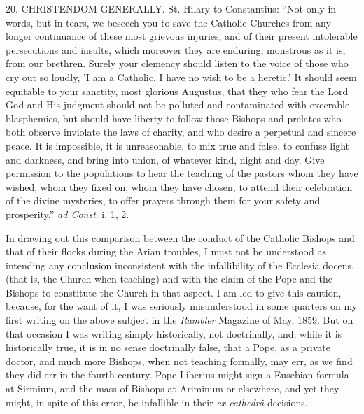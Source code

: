 20. CHRISTENDOM GENERALLY.
St. Hilary to Constantius: ``Not only in words, but in tears, we
beseech you to save the Catholic Churches from any longer continuance
of these most grievous injuries, and of their present intolerable
persecutions and insults, which moreover they are enduring, monstrous as it is, from our brethren. Surely your clemency should
listen to the voice of those who cry out so loudly, 'I am a Catholic,
I have no wish to be a heretic.' It should seem equitable to your
sanctity, most glorious Augustus, that they who fear the Lord God and
His judgment should not be polluted and contaminated with execrable
blasphemies, but should have liberty to follow those Bishops and
prelates who both observe inviolate the laws of charity, and who
desire a perpetual and sincere peace. It is impossible, it is
unreasonable, to mix true and false, to confuse light and darkness,
and bring into union, of whatever kind, night and day. Give permission
to the populations to hear the teaching of the pastors whom they have
wished, whom they fixed on, whom they have chosen, to attend their
celebration of the divine mysteries, to offer prayers through them for
your safety and prosperity.'' \emph{ad Const}. i. 1, 2.

In drawing out this comparison between the conduct of the Catholic
Bishops and that of their flocks during the Arian troubles, I must not
be understood as intending any conclusion inconsistent with the
infallibility of the Ecclesia docens, (that is, the Church when
teaching) and with the claim of the Pope and the Bishops to constitute
the Church in that aspect. I am led to give this caution, because, for
the want of it, I was seriously misunderstood in some quarters on my
first writing on the above subject in the \emph{Rambler} Magazine of
May, 1859. But on that occasion I was writing simply historically, not
doctrinally, and, while it is historically true, it is in no sense
doctrinally false, that a Pope, as a private doctor, and much more
Bishops, when not teaching formally, may err, as we find they did err
in the fourth century. Pope Liberius might sign a Eusebian formula at
Sirmium, and the mass of Bishops at Ariminum or elsewhere, and yet
they might, in spite of this error, be infallible in their \emph{ex
cathedrâ} decisions.

